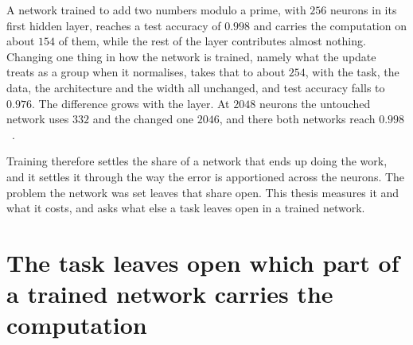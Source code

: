 %
%
%
%
%

A network trained to add two numbers modulo a prime, with $256$ neurons in its
first hidden layer, reaches a test accuracy of $0.998$ and carries the
computation on about $154$ of them, while the rest of the layer contributes
almost nothing. Changing one thing in how the network is trained, namely what the update
treats as a group when it normalises, takes that to about $254$, with the
task, the data, the architecture and the width all unchanged, and test
accuracy falls to $0.976$. The difference grows with the layer. At $2048$
neurons the untouched network uses $332$ and the changed one $2046$, and there
both networks reach $0.998$~\cite{sager_grokking_2026}.

Training therefore settles the share of a network that ends up doing the
work, and it settles it through the way the error is apportioned across the
neurons. The problem the network was set leaves that share open. This thesis
measures it and what it costs, and asks what else a task leaves open in a
trained network.


\section{The task leaves open which part of a trained network carries the computation}
\label{sec:intro_question}

